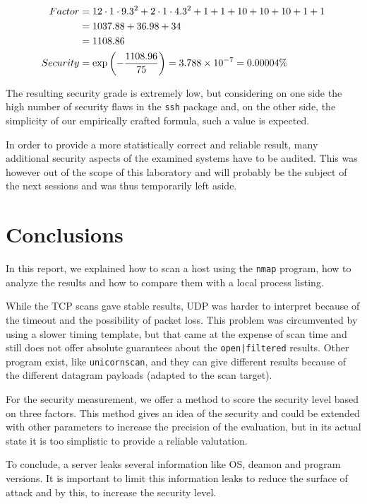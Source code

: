 \documentclass[10pt,a4paper,twoside,onecolumn]{article}
\begin{document}
\vspace{-.5cm}
\begin{align}
	Factor &= 12 \cdot 1 \cdot 9.3^2 + 2 \cdot 1 \cdot 4.3^2 + 1 + 1 + 10 + 10 + 10 + 1 + 1 \nonumber\\
			 &= 1037.88 + 36.98 + 34 \nonumber\\
			 &= 1108.86\nonumber\\
	\label{eq:sec-sys}
	Security &= \exp\left(-{1108.96\over75}\right) = 3.788 \times 10^{-7} = 0.00004\%
\end{align}

The resulting security grade is extremely low, but considering on one side the high number of security flaws in the \texttt{ssh} package and, on the other side, the simplicity of our empirically crafted formula, such a value is expected.

In order to provide a more statistically correct and reliable result, many additional security aspects of the examined systems have to be audited. This was however out of the scope of this laboratory and will probably be the subject of the next sessions and was thus temporarily left aside.

\section{Conclusions}

In this report, we explained how to scan a host using the \texttt{nmap} program, how to analyze the results and how to compare them with a local process listing.

While the TCP scans gave stable results, UDP was harder to interpret because of the timeout and the possibility of packet loss. This problem was circumvented by using a slower timing template, but that came at the expense of scan time and still does not offer absolute guarantees about the \texttt{open|filtered} results. Other program exist, like \texttt{unicornscan}, and they can give different results because of the different datagram payloads (adapted to the scan target).

For the security measurement, we offer a method to score the security level based on three factors. This method gives an idea of the security and could be extended with other parameters to increase the precision of the evaluation, but in its actual state it is too simplistic to provide a reliable valutation.

To conclude, a server leaks several information like OS, deamon and program versions. It is important to limit this information leaks to reduce the surface of attack and by this, to increase the security level.
\end{document}
